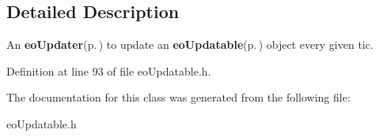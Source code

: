 \subsection{Detailed Description}
An {\bf eo\-Updater}{\rm (p.\,\pageref{classeo_updater})} to update an {\bf eo\-Updatable}{\rm (p.\,\pageref{classeo_updatable})} object every given tic. 



Definition at line 93 of file eo\-Updatable.h.

The documentation for this class was generated from the following file:\begin{CompactItemize}
\item 
eo\-Updatable.h\end{CompactItemize}
